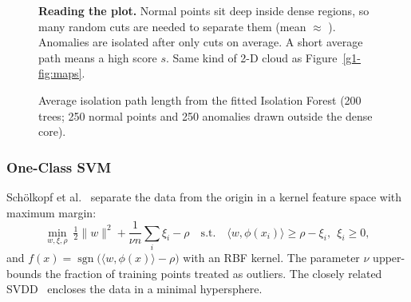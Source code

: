 \begin{figure}[H]
\centering
\begin{minipage}{0.6\textwidth}
\centering
{}
\end{minipage}\hfill
\begin{minipage}{0.36\textwidth}
\small\textbf{Reading the plot.} Normal points sit deep inside dense regions, so many random cuts are
needed to separate them (mean $\approx$ \pathNormal). Anomalies are isolated after only \pathAnom{} cuts on
average. A short average path means a high score $s$. Same kind of 2-D cloud as Figure~\ref{g1-fig:maps}.
\end{minipage}
\caption{Average isolation path length from the fitted Isolation Forest (200 trees; 250 normal points and
250 anomalies drawn outside the dense core).}
\label{g1-fig:pathlen}
\end{figure}

\subsubsection{One-Class SVM}
Schölkopf et al.~\cite{ocsvm} separate the data from the origin in a kernel feature space with maximum margin:
\begin{equation}
  \min_{w,\xi,\rho}\ \tfrac12\lVert w\rVert^2+\frac{1}{\nu n}\sum_i\xi_i-\rho
  \quad\text{s.t.}\quad \langle w,\phi(x_i)\rangle\ge\rho-\xi_i,\ \ \xi_i\ge0,
\end{equation}
and $f(x)=\operatorname{sgn}\bigl(\langle w,\phi(x)\rangle-\rho\bigr)$ with an RBF kernel. The parameter $\nu$
upper-bounds the fraction of training points treated as outliers. The closely related SVDD~\cite{svdd}
encloses the data in a minimal hypersphere.

